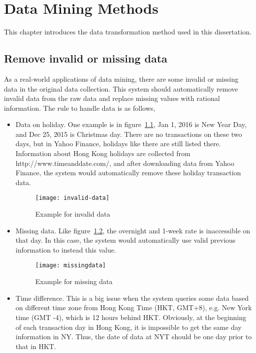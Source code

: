 \chapter{Data Mining Methods}
\label{ch:mining}

This chapter introduces the data transformation method used in this dissertation.
\section{Remove invalid or missing data}
As a real-world applications of data mining, there are some invalid or missing data in the original data collection. This system should automatically remove invalid data from the raw data and replace missing values with rational information. The rule to handle data is as follows,

\clearpage
\begin{itemize}
	\item Data on holiday. One example is in figure~\ref{fg:invalid_data}, Jan 1, 2016 is New Year Day, and Dec 25, 2015 is Christmas day. There are no transactions on these two days, but in Yahoo Finance, holidays like there are still listed there. Information about Hong Kong holidays are collected from http://www.timeanddate.com/, and after downloading data from Yahoo Finance, the system would automatically remove these holiday transaction data.
	\begin{figure}[h]
		\centering
		\texttt{[image: invalid-data]}
		\caption{Example for invalid data}
		\label{fg:invalid_data}
	\end{figure}
	\item Missing data. Like figure~\ref{fg:missing_data}, the overnight and 1-week rate is inaccessible on that day. In this case, the system would automatically use valid previous information to instead this value.
	\begin{figure}[h]
		\centering
		\texttt{[image: missingdata]}
		\caption{Example for missing data}
		\label{fg:missing_data}
	\end{figure}
	\clearpage
	\item Time difference. This is a big issue when the system queries some data based on different time zone from Hong Kong Time (HKT, GMT+8), e.g. New York time (GMT -4), which is 12 hours behind HKT. Obviously, at the beginning of each transaction day in Hong Kong, it is impossible to get the same day information in NY. Thus, the date of data at NYT should be one day prior to that in HKT.
\end{itemize}


